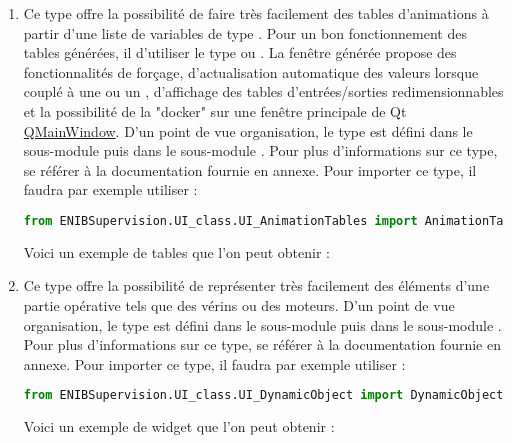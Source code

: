 \begin{enumerate}

\item {}\newline
Ce type offre la possibilité de faire très facilement des tables d'animations à partir d'une liste de variables de type . Pour un bon fonctionnement des tables générées, il  d'utiliser le type  ou .\newline
La fenêtre générée propose des fonctionnalités de forçage, d'actualisation automatique des valeurs lorsque couplé à une  ou un , d'affichage des tables d'entrées/sorties redimensionnables et la possibilité de la "docker" sur une fenêtre principale de Qt \href{https://doc.qt.io/qt-5/qmainwindow.html}{QMainWindow}.\newline
D'un point de vue organisation, le type  est défini dans le sous-module  puis dans le sous-module \newline {}.\newline
Pour plus d'informations sur ce type, se référer à la documentation fournie en annexe.\newline
Pour importer ce type, il faudra par exemple utiliser :
\begin{lstlisting}[language=Python]
from ENIBSupervision.UI_class.UI_AnimationTables import AnimationTables
\end{lstlisting}
Voici un exemple de tables que l'on peut obtenir :


\item {}\newline
Ce type offre la possibilité de représenter très facilement des éléments d'une partie opérative tels que des vérins ou des moteurs.\newline
D'un point de vue organisation, le type  est défini dans le sous-module  puis dans le sous-module \newline {}.\newline
Pour plus d'informations sur ce type, se référer à la documentation fournie en annexe.\newline
Pour importer ce type, il faudra par exemple utiliser :
\begin{lstlisting}[language=Python]
from ENIBSupervision.UI_class.UI_DynamicObject import DynamicObject
\end{lstlisting}
Voici un exemple de widget que l'on peut obtenir :


\end{enumerate}
